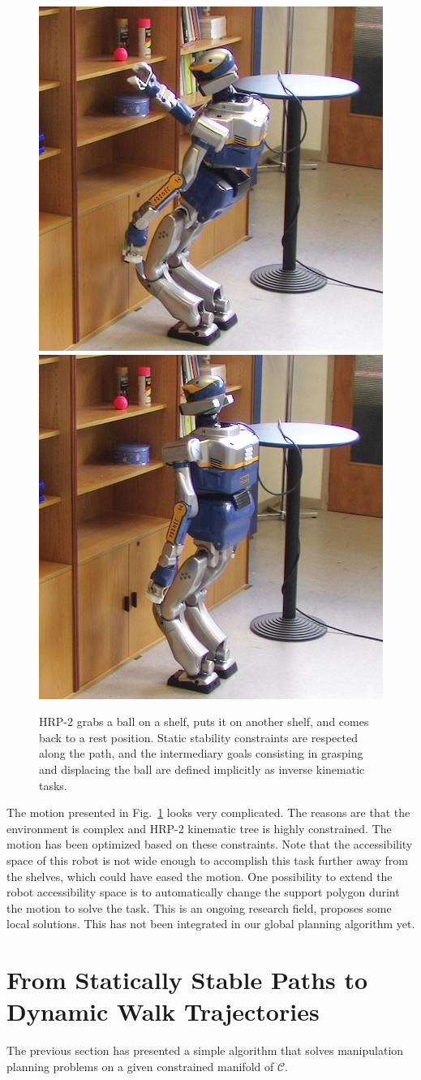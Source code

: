 \documentclass{article}
\begin{document}
\begin{figure}[h]
\includegraphics[width=0.24\linewidth]{pics/wb-shelves/7.jpg}
\includegraphics[width=0.24\linewidth]{pics/wb-shelves/8.jpg}



\caption{HRP-2 grabs a ball on a shelf, puts it on another shelf, and comes back to 
  a rest position. Static stability constraints are respected along the path, and 
  the intermediary goals consisting in grasping and displacing the ball are defined
  implicitly as inverse kinematic tasks.}
\label{fig:wb-shelves}
\end{figure}



The motion presented in Fig.~\ref{fig:wb-shelves} looks very complicated.
The reasons are that the environment is complex and HRP-2 kinematic tree is highly constrained.
The motion has been optimized based on these constraints. Note that the
accessibility space of this robot is not wide enough to accomplish this task further 
away from the shelves, which could have eased the motion. One possibility to extend the
robot accessibility space is to automatically change the support polygon durint the motion to solve the task.
This is an ongoing research field, \cite{OussamaKanoun06102010} proposes some 
local solutions. This has not been integrated in our global planning algorithm yet.



\section{From Statically Stable Paths to Dynamic Walk Trajectories}
\label{sec:wb-step}

The previous section has presented a simple algorithm that solves manipulation planning
problems on a given constrained manifold of $\mathcal{C}$. 
\end{document}
